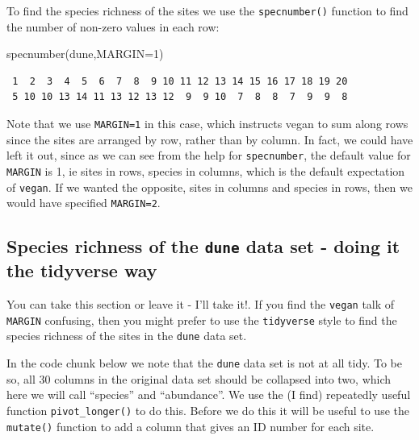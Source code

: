 \documentclass[
  letterpaper,
  DIV=11,
  numbers=noendperiod]{scrreprt}
\newenvironment{Shaded}{\begin{snugshade}}{\end{snugshade}}
\newcommand{\AttributeTok}[1]{\textcolor[rgb]{0.40,0.45,0.13}{#1}}
\newcommand{\DecValTok}[1]{\textcolor[rgb]{0.68,0.00,0.00}{#1}}
\newcommand{\FunctionTok}[1]{\textcolor[rgb]{0.28,0.35,0.67}{#1}}
\newcommand{\NormalTok}[1]{\textcolor[rgb]{0.00,0.23,0.31}{#1}}
\begin{document}
To find the species richness of the sites we use the
\texttt{specnumber()} function to find the number of non-zero values in
each row:

\begin{Shaded}
\begin{Highlighting}[]
\FunctionTok{specnumber}\NormalTok{(dune,}\AttributeTok{MARGIN=}\DecValTok{1}\NormalTok{)}
\end{Highlighting}
\end{Shaded}

\begin{verbatim}
 1  2  3  4  5  6  7  8  9 10 11 12 13 14 15 16 17 18 19 20 
 5 10 10 13 14 11 13 12 13 12  9  9 10  7  8  8  7  9  9  8 
\end{verbatim}

Note that we use \texttt{MARGIN=1} in this case, which instructs vegan
to sum along rows since the sites are arranged by row, rather than by
column. In fact, we could have left it out, since as we can see from the
help for \texttt{specnumber}, the default value for \texttt{MARGIN} is
1, ie sites in rows, species in columns, which is the default
expectation of \texttt{vegan}. If we wanted the opposite, sites in
columns and species in rows, then we would have specified
\texttt{MARGIN=2}.

\subsection{\texorpdfstring{Species richness of the \texttt{dune} data
set - doing it the tidyverse
way}{Species richness of the dune data set - doing it the tidyverse way}}\label{species-richness-of-the-dune-data-set---doing-it-the-tidyverse-way}

You can take this section or leave it - I'll take it!. If you find the
\texttt{vegan} talk of \texttt{MARGIN} confusing, then you might prefer
to use the \texttt{tidyverse} style to find the species richness of the
sites in the \texttt{dune} data set.

In the code chunk below we note that the \texttt{dune} data set is not
at all tidy. To be so, all 30 columns in the original data set should be
collapsed into two, which here we will call ``species'' and
``abundance''. We use the (I find) repeatedly useful function
\texttt{pivot\_longer()} to do this. Before we do this it will be useful
to use the \texttt{mutate()} function to add a column that gives an ID
number for each site.
\end{document}
